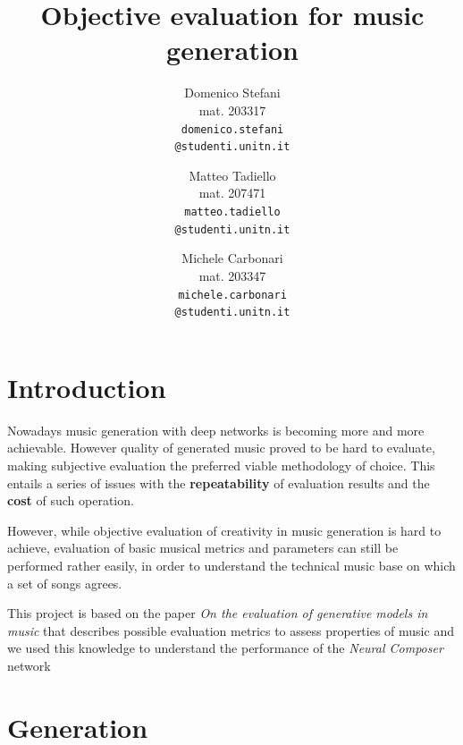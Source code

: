 \documentclass[10pt,twocolumn,letterpaper]{article}
\begin{document}
\title{Objective evaluation for music generation}

\author{Domenico Stefani\\
\small{mat. 203317}\\
{\tt{\small{domenico.stefani}}\\\tt{\small{@studenti.unitn.it}}}
\and
Matteo Tadiello\\
\small{mat. 207471 }\\
{\tt\small matteo.tadiello\\\tt\small @studenti.unitn.it}
\and
Michele Carbonari\\
\small{mat. 203347}\\
{\tt\small michele.carbonari\\\tt\small @studenti.unitn.it}
}

\maketitle{}

\section{Introduction}
Nowadays music generation with deep networks is becoming more and more achievable.
However quality of generated music proved to be hard to evaluate, making subjective evaluation the preferred viable methodology
 of choice.
This entails a series of issues with the \textbf{repeatability} of evaluation results and the \textbf{cost} of such operation.

However, while objective evaluation of creativity in music generation is hard to achieve, evaluation of basic musical metrics and parameters can still be performed rather easily, in order to understand the technical music base on which a set of songs agrees. 


This project is based on the paper \textit{On  the  evaluation  of  generative models in music} \cite{MGeval} that describes possible evaluation metrics to assess properties of music and we used this knowledge to understand the performance of the \textit{Neural Composer} network \cite{Composer}

\section{Generation}
\end{document}
